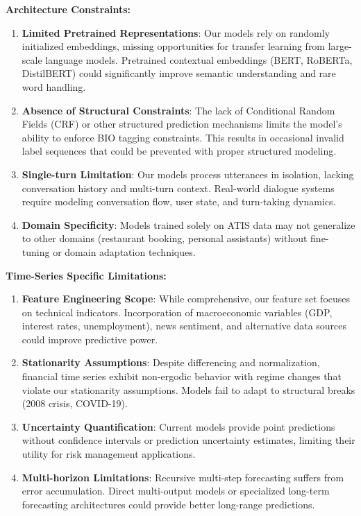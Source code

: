 \documentclass[conference]{IEEEtran}
\begin{document}
\textbf{Architecture Constraints:}
\begin{enumerate}
  \item \textbf{Limited Pretrained Representations}: Our models rely on randomly initialized embeddings, missing opportunities for transfer learning from large-scale language models. Pretrained contextual embeddings (BERT, RoBERTa, DistilBERT) could significantly improve semantic understanding and rare word handling.

  \item \textbf{Absence of Structural Constraints}: The lack of Conditional Random Fields (CRF) or other structured prediction mechanisms limits the model's ability to enforce BIO tagging constraints. This results in occasional invalid label sequences that could be prevented with proper structured modeling.

  \item \textbf{Single-turn Limitation}: Our models process utterances in isolation, lacking conversation history and multi-turn context. Real-world dialogue systems require modeling conversation flow, user state, and turn-taking dynamics.

  \item \textbf{Domain Specificity}: Models trained solely on ATIS data may not generalize to other domains (restaurant booking, personal assistants) without fine-tuning or domain adaptation techniques.
\end{enumerate}

\textbf{Time-Series Specific Limitations:}
\begin{enumerate}
  \item \textbf{Feature Engineering Scope}: While comprehensive, our feature set focuses on technical indicators. Incorporation of macroeconomic variables (GDP, interest rates, unemployment), news sentiment, and alternative data sources could improve predictive power.

  \item \textbf{Stationarity Assumptions}: Despite differencing and normalization, financial time series exhibit non-ergodic behavior with regime changes that violate our stationarity assumptions. Models fail to adapt to structural breaks (2008 crisis, COVID-19).

  \item \textbf{Uncertainty Quantification}: Current models provide point predictions without confidence intervals or prediction uncertainty estimates, limiting their utility for risk management applications.

  \item \textbf{Multi-horizon Limitations}: Recursive multi-step forecasting suffers from error accumulation. Direct multi-output models or specialized long-term forecasting architectures could provide better long-range predictions.
\end{enumerate}
\end{document}
